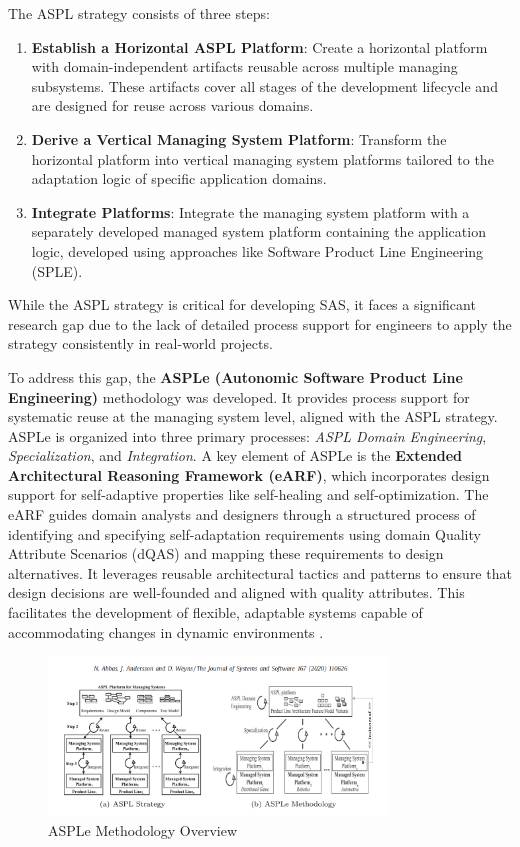 \documentclass[a4paper,10pt]{article}
\begin{document}
The ASPL strategy consists of three steps:

\begin{enumerate}
    \item \textbf{Establish a Horizontal ASPL Platform}: Create a horizontal platform with domain-independent artifacts reusable across multiple managing subsystems. These artifacts cover all stages of the development lifecycle and are designed for reuse across various domains.

    \item \textbf{Derive a Vertical Managing System Platform}: Transform the horizontal platform into vertical managing system platforms tailored to the adaptation logic of specific application domains.

    \item \textbf{Integrate Platforms}: Integrate the managing system platform with a separately developed managed system platform containing the application logic, developed using approaches like Software Product Line Engineering (SPLE).
\end{enumerate}

While the ASPL strategy is critical for developing SAS, it faces a significant research gap due to the lack of detailed process support for engineers to apply the strategy consistently in real-world projects.

To address this gap, the \textbf{ASPLe (Autonomic Software Product Line Engineering)} methodology was developed. It provides process support for systematic reuse at the managing system level, aligned with the ASPL strategy. ASPLe is organized into three primary processes: \textit{ASPL Domain Engineering}, \textit{Specialization}, and \textit{Integration}. A key element of ASPLe is the \textbf{Extended Architectural Reasoning Framework (eARF)}, which incorporates design support for self-adaptive properties like self-healing and self-optimization. The eARF guides domain analysts and designers through a structured process of identifying and specifying self-adaptation requirements using domain Quality Attribute Scenarios (dQAS) and mapping these requirements to design alternatives. It leverages reusable architectural tactics and patterns to ensure that design decisions are well-founded and aligned with quality attributes. This facilitates the development of flexible, adaptable systems capable of accommodating changes in dynamic environments \cite{Nadeem2020}.

\begin{figure}[h]
\centering
\includegraphics[width=0.8\textwidth]{asple_diagram.png}
\caption{ASPLe Methodology Overview}
\label{fig:asple}
\end{figure}
\end{document}

